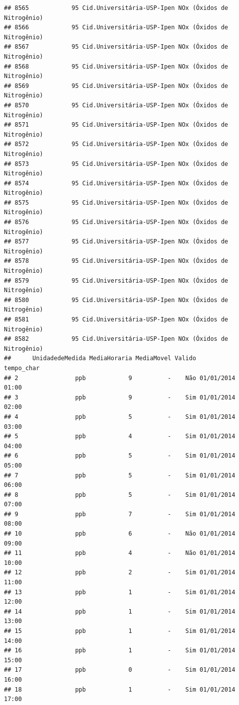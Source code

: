 \documentclass[]{book}
\begin{document}
\begin{verbatim}
## 8565            95 Cid.Universitária-USP-Ipen NOx (Óxidos de Nitrogênio)
## 8566            95 Cid.Universitária-USP-Ipen NOx (Óxidos de Nitrogênio)
## 8567            95 Cid.Universitária-USP-Ipen NOx (Óxidos de Nitrogênio)
## 8568            95 Cid.Universitária-USP-Ipen NOx (Óxidos de Nitrogênio)
## 8569            95 Cid.Universitária-USP-Ipen NOx (Óxidos de Nitrogênio)
## 8570            95 Cid.Universitária-USP-Ipen NOx (Óxidos de Nitrogênio)
## 8571            95 Cid.Universitária-USP-Ipen NOx (Óxidos de Nitrogênio)
## 8572            95 Cid.Universitária-USP-Ipen NOx (Óxidos de Nitrogênio)
## 8573            95 Cid.Universitária-USP-Ipen NOx (Óxidos de Nitrogênio)
## 8574            95 Cid.Universitária-USP-Ipen NOx (Óxidos de Nitrogênio)
## 8575            95 Cid.Universitária-USP-Ipen NOx (Óxidos de Nitrogênio)
## 8576            95 Cid.Universitária-USP-Ipen NOx (Óxidos de Nitrogênio)
## 8577            95 Cid.Universitária-USP-Ipen NOx (Óxidos de Nitrogênio)
## 8578            95 Cid.Universitária-USP-Ipen NOx (Óxidos de Nitrogênio)
## 8579            95 Cid.Universitária-USP-Ipen NOx (Óxidos de Nitrogênio)
## 8580            95 Cid.Universitária-USP-Ipen NOx (Óxidos de Nitrogênio)
## 8581            95 Cid.Universitária-USP-Ipen NOx (Óxidos de Nitrogênio)
## 8582            95 Cid.Universitária-USP-Ipen NOx (Óxidos de Nitrogênio)
##      UnidadedeMedida MediaHoraria MediaMovel Valido       tempo_char
## 2                ppb            9          -    Não 01/01/2014 01:00
## 3                ppb            9          -    Sim 01/01/2014 02:00
## 4                ppb            5          -    Sim 01/01/2014 03:00
## 5                ppb            4          -    Sim 01/01/2014 04:00
## 6                ppb            5          -    Sim 01/01/2014 05:00
## 7                ppb            5          -    Sim 01/01/2014 06:00
## 8                ppb            5          -    Sim 01/01/2014 07:00
## 9                ppb            7          -    Sim 01/01/2014 08:00
## 10               ppb            6          -    Não 01/01/2014 09:00
## 11               ppb            4          -    Não 01/01/2014 10:00
## 12               ppb            2          -    Sim 01/01/2014 11:00
## 13               ppb            1          -    Sim 01/01/2014 12:00
## 14               ppb            1          -    Sim 01/01/2014 13:00
## 15               ppb            1          -    Sim 01/01/2014 14:00
## 16               ppb            1          -    Sim 01/01/2014 15:00
## 17               ppb            0          -    Sim 01/01/2014 16:00
## 18               ppb            1          -    Sim 01/01/2014 17:00

\end{verbatim}
\end{document}
